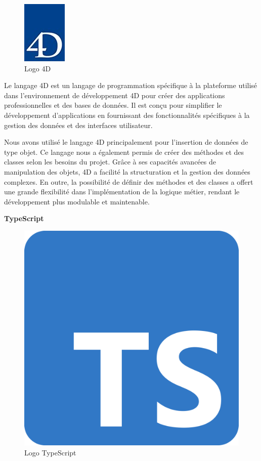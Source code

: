 \begin{figure}[htbp]
   \centering
   \includegraphics[scale=0.8]{Images/logo-4d.jpg} 
   \caption{Logo 4D}
   \label{fig:4D}
\end{figure}
Le langage 4D est un langage de programmation spécifique à la
plateforme utilisé dans l’environnement de développement 4D pour
créer des applications professionnelles et des bases de données. 
Il est conçu pour simplifier le développement d’applications 
en fournissant des fonctionnalités spécifiques à la gestion des 
données et des interfaces utilisateur\cite{4d}. 
\newline

Nous avons utilisé le langage 4D principalement pour l'insertion de données de type objet. Ce langage nous a également permis de créer des méthodes et des classes selon les besoins du projet. Grâce à ses capacités avancées de manipulation des objets, 4D a facilité la structuration et la gestion des données complexes. En outre, la possibilité de définir des méthodes et des classes a offert une grande flexibilité dans l'implémentation de la logique métier, rendant le développement plus modulable et maintenable.
\newline

\large 
\textbf{TypeScript}
\begin{figure}[h]
   \centering
   \includegraphics[scale=0.05]{Images/ts.png} 
   \caption{Logo TypeScript}
   \label{fig:ts}
\end{figure}

